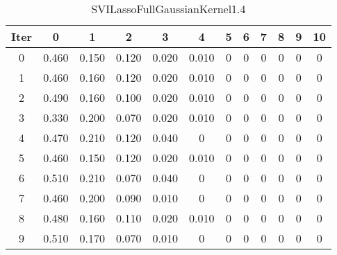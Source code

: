 \begin{table}
	\begin{center}
		\begin{tabular}{|c|c|c|c|c|c|c|c|c|c|c|c|}
			\hline
			Iter & 0 & 1 & 2 & 3 & 4 & 5 & 6 & 7 & 8 & 9 & 10 \\
			\hline
			0 & 0.460 & 0.150 & 0.120 & 0.020 & 0.010 & 0 & 0 & 0 & 0 & 0 & 0 \\
			\hline
			1 & 0.460 & 0.160 & 0.120 & 0.020 & 0.010 & 0 & 0 & 0 & 0 & 0 & 0 \\
			\hline
			2 & 0.490 & 0.160 & 0.100 & 0.020 & 0.010 & 0 & 0 & 0 & 0 & 0 & 0 \\
			\hline
			3 & 0.330 & 0.200 & 0.070 & 0.020 & 0.010 & 0 & 0 & 0 & 0 & 0 & 0 \\
			\hline
			4 & 0.470 & 0.210 & 0.120 & 0.040 & 0 & 0 & 0 & 0 & 0 & 0 & 0 \\
			\hline
			5 & 0.460 & 0.150 & 0.120 & 0.020 & 0.010 & 0 & 0 & 0 & 0 & 0 & 0 \\
			\hline
			6 & 0.510 & 0.210 & 0.070 & 0.040 & 0 & 0 & 0 & 0 & 0 & 0 & 0 \\
			\hline
			7 & 0.460 & 0.200 & 0.090 & 0.010 & 0 & 0 & 0 & 0 & 0 & 0 & 0 \\
			\hline
			8 & 0.480 & 0.160 & 0.110 & 0.020 & 0.010 & 0 & 0 & 0 & 0 & 0 & 0 \\
			\hline
			9 & 0.510 & 0.170 & 0.070 & 0.010 & 0 & 0 & 0 & 0 & 0 & 0 & 0 \\
			\hline
		\end{tabular}
	\end{center}
	\caption{SVILassoFullGaussianKernel1.4}
\end{table}